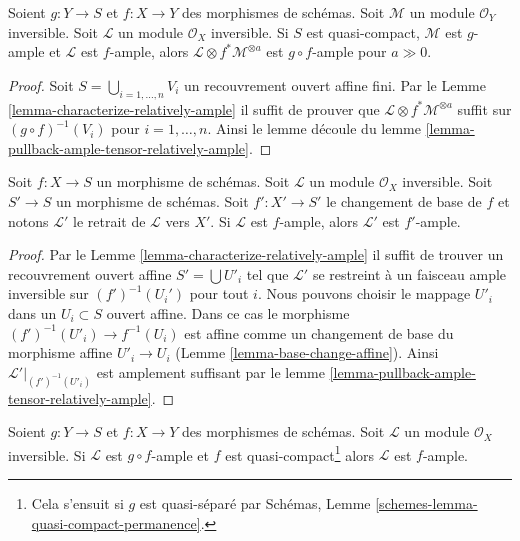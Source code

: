 \begin{lemma}
\label{lemma-ample-composition}
Soient $g : Y \to S$ et $f : X \to Y$ des morphismes de schémas.
Soit $\mathcal{M}$ un module $\mathcal{O}_Y$ inversible.
Soit $\mathcal{L}$ un module $\mathcal{O}_X$ inversible. Si
$S$ est quasi-compact, $\mathcal{M}$ est $g$-ample
et $\mathcal{L}$ est
$f$-ample, alors $\mathcal{L} \otimes f^*\mathcal{M}^{\otimes a}$ est $g \circ f$-ample
pour $a \gg 0$.
\end{lemma}

\begin{proof}
Soit $S = \bigcup_{i = 1, \ldots, n} V_i$ un recouvrement ouvert affine
fini. Par le Lemme \ref{lemma-characterize-relatively-ample}
il suffit de
prouver que $\mathcal{L} \otimes f^*\mathcal{M}^{\otimes a}$ suffit
sur $(g \circ f)^{-1}(V_i)$ pour $i = 1, \ldots, n$.
Ainsi le lemme
découle du lemme \ref{lemma-pullback-ample-tensor-relatively-ample}.
\end{proof}

\begin{lemma}
\label{lemma-ample-base-change}
Soit $f : X \to S$ un morphisme de schémas. Soit
$\mathcal{L}$ un module $\mathcal{O}_X$ inversible. Soit $S' \to S$
un morphisme de schémas. Soit $f' : X' \to S'$
le changement de base de $f$ et notons $\mathcal{L}'$
le retrait de $\mathcal{L}$ vers $X'$. Si $\mathcal{L}$
est $f$-ample, alors $\mathcal{L}'$ est $f'$-ample.
\end{lemma}

\begin{proof}
Par le Lemme \ref{lemma-characterize-relatively-ample} il suffit de trouver un recouvrement
ouvert affine $S' = \bigcup U'_i$ tel que $\mathcal{L}'$
se restreint à un faisceau ample inversible
sur $(f')^{-1}(U_i')$ pour tout $i$. Nous pouvons
choisir le mappage $U'_i$ dans un $U_i \subset S$
ouvert affine. Dans ce cas le morphisme $(f')^{-1}(U'_i) \to f^{-1}(U_i)$
est affine comme un changement de base
du morphisme affine $U'_i \to U_i$ (Lemme
\ref{lemma-base-change-affine}). Ainsi $\mathcal{L}'|_{(f')^{-1}(U'_i)}$ est
amplement suffisant par le lemme \ref{lemma-pullback-ample-tensor-relatively-ample}.
\end{proof}

\begin{lemma}
\label{lemma-ample-permanence}
Soient $g : Y \to S$ et $f : X \to Y$ des morphismes de schémas. Soit
$\mathcal{L}$ un module $\mathcal{O}_X$ inversible. Si $\mathcal{L}$
est $g \circ f$-ample et $f$ est quasi-compact\footnote{Cela
s'ensuit si $g$ est quasi-séparé
par Schémas, Lemme \ref{schemes-lemma-quasi-compact-permanence}.} alors $\mathcal{L}$
est $f$-ample.
\end{lemma}

